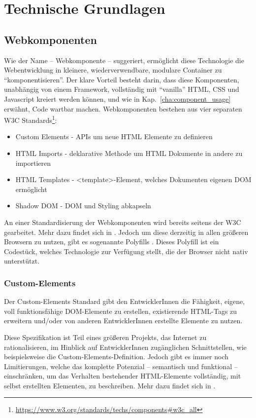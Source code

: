 \chapter{Technische Grundlagen}

\section{Webkomponenten}
\label{cha:webcomponents}
Wie der Name -- Webkomponente -- suggeriert, ermöglicht diese Technologie die Webentwicklung in kleinere, wiederverwendbare, modulare Container zu "`komponentisieren"'.  Der klare Vorteil besteht darin, dass diese Komponenten, unabhängig von einem Framework, vollständig mit "`vanilla"' HTML, CSS und Javascript kreiert werden können, und wie in Kap.~\ref{cha:component_usage} erwähnt, Code wartbar machen.
\newline
Webkomponenten bestehen aus vier separaten W3C Standards\footnote{\url{https://www.w3.org/standards/techs/components\#w3c\_all}}:
\begin{itemize}
	\item Custom Elements - APIs um neue HTML Elemente zu definieren
	\item HTML Imports - deklarative Methode um HTML Dokumente in andere zu importieren
	\item HTML Templates - <template>-Element, welches Dokumenten eigenen DOM ermöglicht
	\item Shadow DOM - DOM und Styling abkapseln
\end{itemize}
An einer Standardisierung der Webkomponenten wird bereits seitens der W3C gearbeitet. Mehr dazu findet sich in \cite{w3c-components}. Jedoch um diese derzeitig in allen größeren Browsern zu nutzen, gibt es sogenannte Polyfills \cite{polyfill}. Dieses Polyfill ist ein Codestück, welches Technologie zur Verfügung stellt, die der Browser nicht nativ unterstützt.

\subsection{Custom-Elements}
Der Custom-Elements Standard gibt den EntwicklerInnen die Fähigkeit, eigene, voll funktionsfähige DOM-Elemente zu erstellen, existierende HTML-Tags zu erweitern und/oder von anderen EntwicklerInnen erstellte Elemente zu nutzen.  

Diese Spezifikation ist Teil eines größeren Projekts, das Internet zu rationalisieren, im Hinblick auf EntwicklerInnen zugänglichen Schnittstellen, wie beispielsweise die Custom-Elements-Definition. Jedoch gibt es immer noch Limitierungen, welche das komplette Potenzial -- semantisch und funktional -- einschränken, um das Verhalten bestehender HTML-Elemente vollständig, mit selbst erstellten Elementen, zu beschreiben. Mehr dazu findet sich in \cite{custom-elements}.

